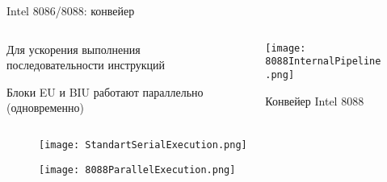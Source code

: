 \documentclass[aspectratio=169,14pt]{beamer}
\begin{document}
\begin{frame}{Intel 8086/8088: конвейер}
    \begin{columns}[T,onlytextwidth]
        \begin{column}{0.5\textwidth}
            \begin{itemize}
                \begin{spacing}{0.8}
                \item Для ускорения выполнения последовательности инструкций
                \item Блоки EU и BIU работают параллельно (одновременно)
                \end{spacing}
            \end{itemize}
        \end{column}
        \begin{column}{0.5\textwidth}
            \begin{figure}[htp]
                \centering
                \texttt{[image: 8088InternalPipeline.png]}
                \captionsetup{skip=-8pt}
                \caption{\tiny{Конвейер Intel 8088}}
            \end{figure}
        \end{column}
    \end{columns}
    \begin{figure}[htp]
        \centering
        \texttt{[image: StandartSerialExecution.png]}
        \captionsetup{skip=-5pt}
    \end{figure}
    \begin{figure}[htp]
        \centering
        \texttt{[image: 8088ParallelExecution.png]}
        \captionsetup{skip=-5pt}
    \end{figure}
\end{frame}
\end{document}
